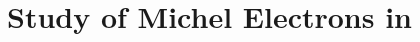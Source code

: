 \chapter{\label{ch:6-michel}Study of Michel Electrons in \protodune{}} 

\minitoc

%
% 
% 
% 
% 
% 
%


